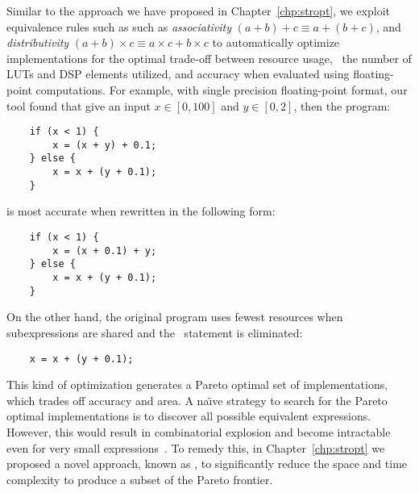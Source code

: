 
Similar to the approach we have proposed in Chapter~\ref{chp:stropt}, we
exploit equivalence rules such as such as \emph{associativity} $(a + b) +
c \equiv a + (b + c)$, and \emph{distributivity} $(a + b) \times c \equiv
a \times c + b \times c$ to automatically optimize implementations for
the optimal trade-off between resource usage, \ie~the number of LUTs and
DSP elements utilized, and accuracy when evaluated using floating-point
computations.  For example, with single precision floating-point format, our
tool found that give an input $x \in [0, 100]$ and $y \in [0, 2]$, then the
program:
\begin{lstlisting}
    if (x < 1) {
        x = (x + y) + 0.1;
    } else {
        x = x + (y + 0.1);
    }
\end{lstlisting}
is most accurate when rewritten in the following form:
\begin{lstlisting}
    if (x < 1) {
        x = (x + 0.1) + y;
    } else {
        x = x + (y + 0.1);
    }
\end{lstlisting}
On the other hand, the original program uses fewest resources when
subexpressions are shared and the \iflit~statement is eliminated:
\begin{lstlisting}
    x = x + (y + 0.1);
\end{lstlisting}

This kind of optimization generates a Pareto optimal set of implementations,
which trades off accuracy and area.  A na{\"\i}ve strategy to search for
the Pareto optimal implementations is to discover all possible equivalent
expressions.  However, this would result in combinatorial explosion and become
intractable even for very small expressions~\cite{ioualalen,mouilleron}.  To
remedy this, in Chapter~\ref{chp:stropt} we proposed a novel approach, known
as \soap, to significantly reduce the space and time complexity to produce a
subset of the Pareto frontier. 


